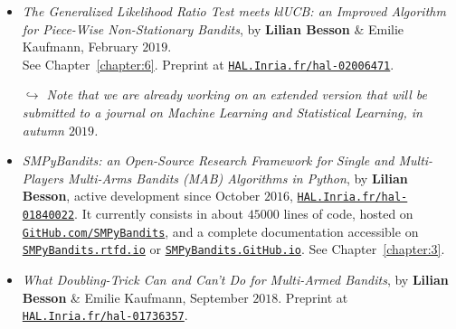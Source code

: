 \begin{itemize}

\item
    \emph{The Generalized Likelihood Ratio Test meets klUCB: an Improved Algorithm for Piece-Wise Non-Stationary Bandits},
    by \textbf{Lilian Besson} \& Emilie Kaufmann,
    February $2019$.\\
    See Chapter~\ref{chapter:6}.
    Preprint at \href{https://HAL.Inria.fr/hal-02006471}{\texttt{HAL.Inria.fr/hal-02006471}}.
    \cite{Besson2019GLRT}

    \emph{$\hookrightarrow$ Note that we are already working on an extended version that will be submitted to a journal on Machine Learning and Statistical Learning, in autumn $2019$.}

\item
    \emph{SMPyBandits: an Open-Source Research Framework for Single and Multi-Players Multi-Arms Bandits (MAB) Algorithms in Python},
    by \textbf{Lilian Besson}, active development since October $2016$,
    \href{https://HAL.Inria.fr/hal-01840022}{\texttt{HAL.Inria.fr/hal-01840022}}.
    It currently consists in about $45000$ lines of code, hosted on \href{https://GitHub.com/SMPyBandits}{\texttt{GitHub.com/SMPyBandits}},
    and a complete documentation accessible on \href{https://SMPyBandits.rtfd.io}{\texttt{SMPyBandits.rtfd.io}} or \href{https://SMPyBandits.GitHub.io}{\texttt{SMPyBandits.GitHub.io}}.
    See Chapter~\ref{chapter:3}.
    \cite{SMPyBanditsJMLR,SMPyBandits}

\item
    \emph{What Doubling-Trick Can and Can't Do for Multi-Armed Bandits},
    by \textbf{Lilian Besson} \& Emilie Kaufmann,
    September $2018$.
    Preprint at \href{https://HAL.Inria.fr/hal-01736357}{\texttt{HAL.Inria.fr/hal-01736357}}.
    \cite{Besson2018DoublingTricks}

\end{itemize}






